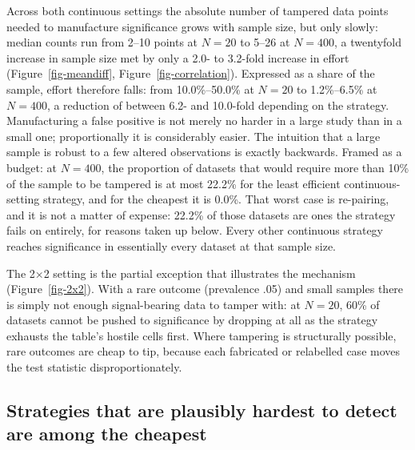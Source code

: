 \documentclass[
  nonatbib,
  authoryear,
  preprint]{elsarticle}
\begin{document}
Across both continuous settings the absolute number of tampered data
points needed to manufacture significance grows with sample size, but
only slowly: median counts run from 2--10 points at \(N = 20\) to 5--26
at \(N = 400\), a twentyfold increase in sample size met by only a 2.0-
to 3.2-fold increase in effort (Figure~\ref{fig-meandiff},
Figure~\ref{fig-correlation}). Expressed as a share of the sample,
effort therefore falls: from 10.0\%--50.0\% at \(N = 20\) to
1.2\%--6.5\% at \(N = 400\), a reduction of between 6.2- and 10.0-fold
depending on the strategy. Manufacturing a false positive is not merely
no harder in a large study than in a small one; proportionally it is
considerably easier. The intuition that a large sample is robust to a
few altered observations is exactly backwards. Framed as a budget: at
\(N = 400\), the proportion of datasets that would require more than
10\% of the sample to be tampered is at most 22.2\% for the least
efficient continuous-setting strategy, and for the cheapest it is 0.0\%.
That worst case is re-pairing, and it is not a matter of expense: 22.2\%
of those datasets are ones the strategy fails on entirely, for reasons
taken up below. Every other continuous strategy reaches significance in
essentially every dataset at that sample size.

The 2×2 setting is the partial exception that illustrates the mechanism
(Figure~\ref{fig-2x2}). With a rare outcome (prevalence .05) and small
samples there is simply not enough signal-bearing data to tamper with:
at \(N = 20\), 60\% of datasets cannot be pushed to significance by
dropping at all as the strategy exhausts the table's hostile cells
first. Where tampering is structurally possible, rare outcomes are cheap
to tip, because each fabricated or relabelled case moves the test
statistic disproportionately.

\subsection{Strategies that are plausibly hardest to detect are among
the
cheapest}\label{strategies-that-are-plausibly-hardest-to-detect-are-among-the-cheapest}
\end{document}
